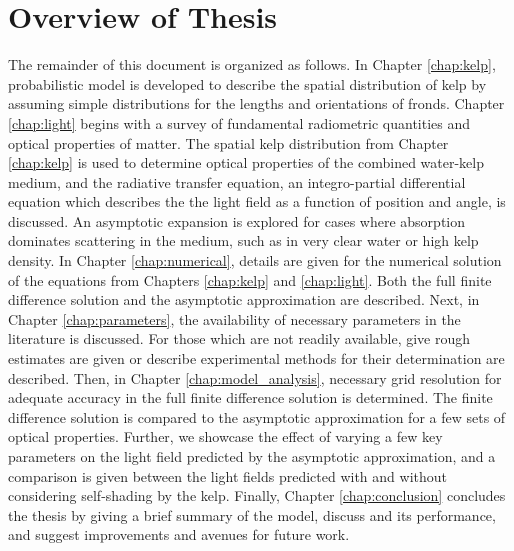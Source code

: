 \section{Overview of Thesis}
The remainder of this document is organized as follows.
In Chapter \ref{chap:kelp}, probabilistic model is developed to describe the spatial distribution of kelp by assuming simple distributions for the lengths and orientations of fronds.
Chapter \ref{chap:light} begins with a survey of fundamental radiometric quantities and optical properties of matter.
The spatial kelp distribution from Chapter \ref{chap:kelp} is used to determine optical properties of the combined water-kelp medium,
and the radiative transfer equation, an integro-partial differential equation which describes the the light field as a function of position and angle, is discussed.
An asymptotic expansion is explored for cases where absorption dominates scattering in the medium, such as in very clear water or high kelp density.
In Chapter \ref{chap:numerical}, details are given for the numerical solution of the equations from Chapters \ref{chap:kelp} and \ref{chap:light}.
Both the full finite difference solution and the asymptotic approximation are described.
Next, in Chapter \ref{chap:parameters}, the availability of necessary parameters in the literature is discussed.
For those which are not readily available, give rough estimates are given or describe experimental methods for their determination are described.
Then, in Chapter \ref{chap:model_analysis}, necessary grid resolution for adequate accuracy in the full finite difference solution is determined.
The finite difference solution is compared to the asymptotic approximation for a few sets of optical properties.
Further, we showcase the effect of varying a few key parameters on the light field predicted by the asymptotic approximation, and
a comparison is given between the light fields predicted with and without considering self-shading by the kelp.
Finally, Chapter \ref{chap:conclusion} concludes the thesis by giving a brief summary of the model, discuss and its performance, and suggest improvements and avenues for future work.
